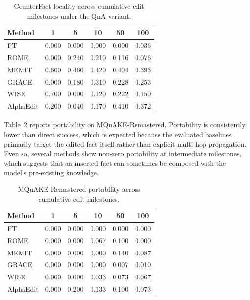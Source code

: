 \begin{table}[H]
    \centering
    \caption{CounterFact locality across cumulative edit milestones under the QnA variant.}
    \label{tab:cfact_locality_qna}
    \begin{tabular}{lccccc}
        \toprule
        Method & 1 & 5 & 10 & 50 & 100 \\
        \midrule
        FT & 0.000 & 0.000 & 0.000 & 0.000 & 0.036 \\
        ROME & 0.000 & 0.240 & 0.210 & 0.116 & 0.076 \\
        MEMIT & 0.600 & 0.460 & 0.420 & 0.404 & 0.393 \\
        GRACE & 0.000 & 0.180 & 0.310 & 0.228 & 0.253 \\
        WISE & 0.700 & 0.000 & 0.120 & 0.222 & 0.150 \\
        AlphaEdit & 0.200 & 0.040 & 0.170 & 0.410 & 0.372 \\
        \bottomrule
    \end{tabular}
\end{table}

Table~\ref{tab:mquake_portability} reports portability on MQuAKE-Remastered. Portability is consistently lower than direct success, which is expected because the evaluated baselines primarily target the edited fact itself rather than explicit multi-hop propagation. Even so, several methods show non-zero portability at intermediate milestones, which suggests that an inserted fact can sometimes be composed with the model's pre-existing knowledge.

\begin{table}[H]
    \centering
    \caption{MQuAKE-Remastered portability across cumulative edit milestones.}
    \label{tab:mquake_portability}
    \begin{tabular}{lccccc}
        \toprule
        Method & 1 & 5 & 10 & 50 & 100 \\
        \midrule
        FT & 0.000 & 0.000 & 0.000 & 0.000 & 0.000 \\
        ROME & 0.000 & 0.000 & 0.067 & 0.100 & 0.000 \\
        MEMIT & 0.000 & 0.000 & 0.000 & 0.140 & 0.087 \\
        GRACE & 0.000 & 0.000 & 0.000 & 0.007 & 0.010 \\
        WISE & 0.000 & 0.000 & 0.033 & 0.073 & 0.067 \\
        AlphaEdit & 0.000 & 0.200 & 0.133 & 0.100 & 0.073 \\
        \bottomrule
    \end{tabular}
\end{table}

